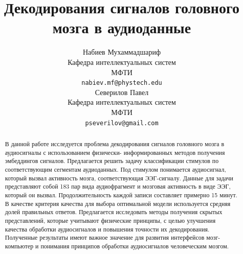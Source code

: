 \documentclass{article}
\title{Декодирования сигналов головного мозга в аудиоданные}
\author{ Набиев Мухаммадшариф \\
        Кафедра интеллектуальных систем\\
	МФТИ\\
	\texttt{nabiev.mf@phystech.edu} \\
	\And
	Северилов Павел \\
	Кафедра интеллектуальных систем\\
	МФТИ\\
	\texttt{pseverilov@gmail.com} \\
}
\date{}
\begin{document}
\maketitle

\begin{abstract}
В данной работе исследуется проблема декодирования сигналов головного мозга в аудиосигналы с использованием физически- информированных методов получения эмбеддингов сигналов. Предлагается решить задачу классификации стимулов по соответствующим сегментам аудиоданных. Под стимулом понимается аудиосигнал, который вызвал активность мозга, соответствующая ЭЭГ-сигналу. Данные для задачи представляют собой 183 пар вида аудиофрагмент и мозговая активность в виде ЭЭГ, который он вызвал. Продолжительность каждой записи составляет примерно 15 минут. В качестве критерия качества для выбора оптимальной модели используется средняя долей правильных ответов. Предлагается исследовать методы получения скрытых представлений, которые учитывают физические принципы, с целью улучшения качества обработки аудиосигналов и повышения точности их декодирования. Полученные результаты имеют важное значение для развития интерфейсов мозг-компьютер и понимания принципов обработки аудиосигналов человеческим мозгом.

\end{abstract}

\end{document}
